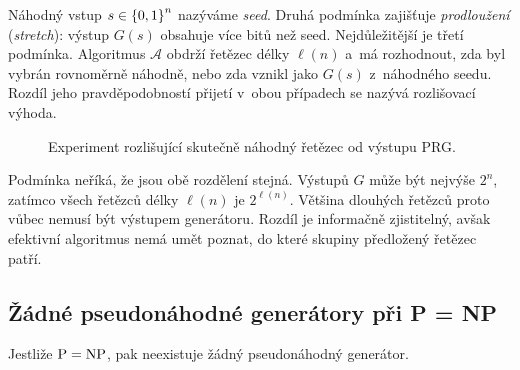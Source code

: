 Náhodný vstup $s\in\left\{0,1\right\}^{n}$ nazýváme \emph{seed}. Druhá podmínka zajišťuje \emph{prodloužení} (\emph{stretch}): výstup $G(s)$ obsahuje více bitů než seed. Nejdůležitější je třetí podmínka. Algoritmus $\mathcal A$ obdrží řetězec délky $\ell(n)$ a~má rozhodnout, zda byl vybrán rovnoměrně náhodně, nebo zda vznikl jako $G(s)$ z~náhodného seedu. Rozdíl jeho pravděpodobností přijetí v~obou případech se nazývá rozlišovací výhoda.

\begin{figure}[ht]
    \centering
    
    \caption{Experiment rozlišující skutečně náhodný řetězec od výstupu PRG.}
    \label{fig:krypto-prg}
\end{figure}

Podmínka neříká, že jsou obě rozdělení stejná. Výstupů $G$ může být nejvýše $2^n$, zatímco všech řetězců délky $\ell(n)$ je $2^{\ell(n)}$. Většina dlouhých řetězců proto vůbec nemusí být výstupem generátoru. Rozdíl je informačně zjistitelný, avšak efektivní algoritmus nemá umět poznat, do které skupiny předložený řetězec patří.


\subsection{Žádné pseudonáhodné generátory při P = NP}

\begin{proposition}
    Jestliže $\operatorname{P}=\operatorname{NP}$, pak neexistuje žádný pseudonáhodný generátor.
\end{proposition}

